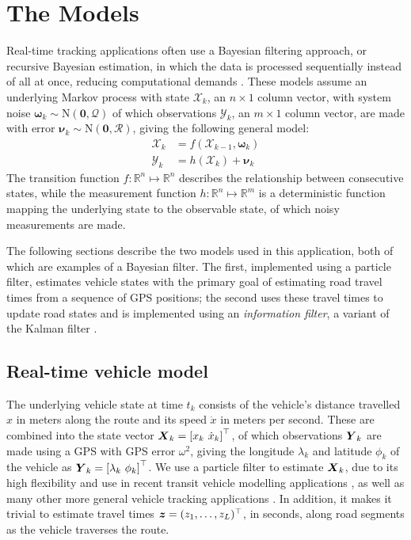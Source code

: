 \section{The Models}
\label{sec:models}

Real-time tracking applications often use
a Bayesian filtering approach,
or recursive Bayesian estimation,
in which the data is processed sequentially instead of all at once,
reducing computational demands
\citep{Anderson_2012}.
These models assume an underlying Markov process with state $\boldsymbol{\mathcal{X}}_k$,
an $n\times1$ column vector,
with system noise $\boldsymbol{\omega}_k\sim\mathrm{N}(\boldsymbol{0},\mathcal{Q})$ 
of which observations $\boldsymbol{\mathcal{Y}}_k$,
an $m\times1$ column vector, are made
with error $\boldsymbol{\nu}_k\sim\mathrm{N}(\boldsymbol{0},\mathcal{R})$,
giving the following general model:
\begin{equation}
\label{eq:rbe_model}
\begin{split}
\boldsymbol{\mathcal{X}}_k &= f(\boldsymbol{\mathcal{X}}_{k-1}, \boldsymbol{\omega}_k) \\
\boldsymbol{\mathcal{Y}}_k &= h(\boldsymbol{\mathcal{X}}_k) + \boldsymbol{\nu}_k
\end{split}
\end{equation}
The transition function $f:\mathbb{R}^n\mapsto\mathbb{R}^n$ 
describes the relationship between consecutive states,
while the measurement function $h:\mathbb{R}^n\mapsto\mathbb{R}^m$ is a deterministic function
mapping the underlying state to the observable state,
of which noisy measurements are made.



The following sections describe the two models used in this application,
both of which are examples of a Bayesian filter.
The first, implemented using a particle filter, estimates vehicle states
with the primary goal of estimating road travel times from a sequence of GPS positions;
the second uses these travel times to update road states 
and is implemented using an \emph{information filter},
a variant of the Kalman filter \citep{Anderson_2012}.

\subsection{Real-time vehicle model}
\label{sec:pf}

The underlying vehicle state at time $t_k$ consists of
the vehicle's distance travelled $x$ in meters along the route and
its speed $\dot x$ in meters per second.
These are combined into the state vector
$\mbox{$\boldsymbol{X}$}_k = \left[x_k\ \dot x_k\right]^\top$,
of which observations $\mbox{$\boldsymbol{Y}$}_k$ are made using a GPS
with GPS error $\omega^2$,
giving the longitude $\lambda_k$ and latitude $\phi_k$ of the vehicle
as $\bY_k = \left[\lambda_k\ \phi_k \right]^\top$.
We use a particle filter to estimate $\mbox{$\boldsymbol{X}$}_k$,
due to its high flexibility and use in recent 
transit vehicle modelling applications \citep{Hans_2015},
as well as many other more general vehicle tracking 
applications \citep{}.
In addition, it makes it trivial to estimate travel times
$\boldsymbol{z} = (z_1,\ldots,z_L)^\top$, in seconds, along road segments
as the vehicle traverses the route.


